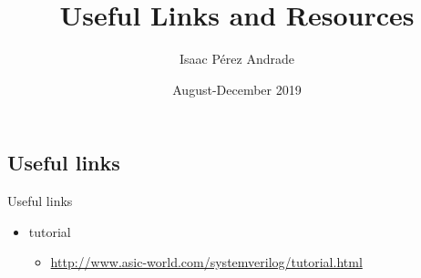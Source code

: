 \documentclass{beamer}
\title{Useful Links and Resources}
\author{Isaac P\'erez Andrade}
\institute[ITESM Guadalajara] %
{
  Department of Electronics\\
}
\date{August-December 2019}
\begin{document}
\begin{frame} \titlepage \end{frame}

\subsection{Useful links}
\begin{frame}{Useful links}{}
\begin{itemize}
\item \SV tutorial 
  \begin{itemize}
  \item \url{http://www.asic-world.com/systemverilog/tutorial.html}
  \end{itemize}
\end{itemize}
\end{frame}
\end{document}
